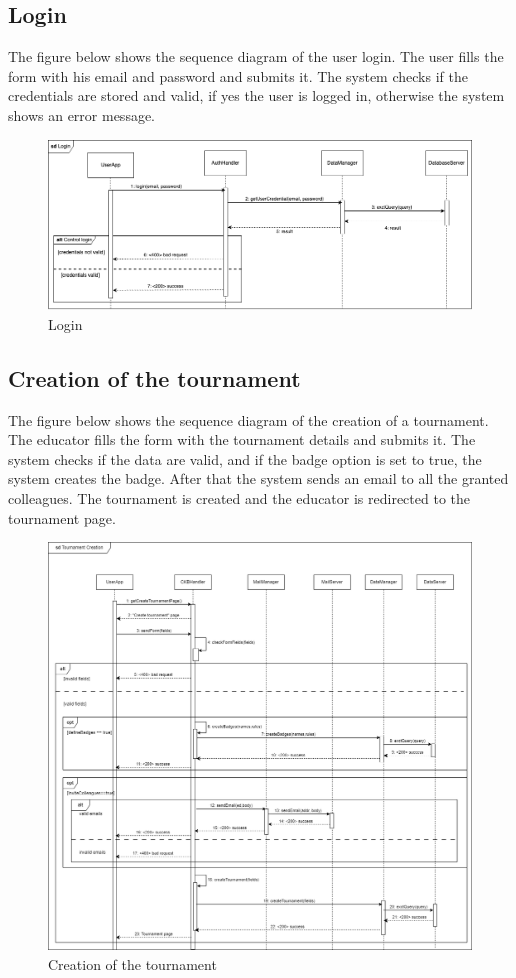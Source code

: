 \subsection{Login}
The figure below shows the sequence diagram of the user login. The user fills the form with his email and password and submits it. 
The system checks if the credentials are stored and valid, if yes the user is logged in, otherwise the system shows an error message.
\begin{figure}[H]
    \centering
    \includegraphics[width=1\textwidth]{images/seq_diagrams/Login_DD.png}
    \caption{Login}
\end{figure}
\clearpage

\subsection{Creation of the tournament}
The figure below shows the sequence diagram of the creation of a tournament. The educator fills the form
 with the tournament details and submits it. The system checks if the data are valid, and if the badge option is set to true, the system creates the badge.
 After that the system sends an email to all the granted colleagues. The tournament is created and the educator is redirected to the tournament page.

 \begin{figure}[H]
    \centering
    \includegraphics[width=1\textwidth]{images/seq_diagrams/tournament_creation_DD.png}
    \caption{Creation of the tournament}
\end{figure}
\clearpage

